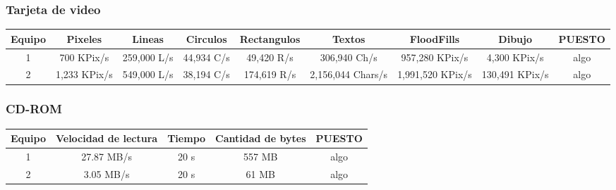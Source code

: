 \subsubsection{Tarjeta de video}
\begin{center}
\begin{tabular}{|ccccccccc|} \hline
\footnotesize\textbf{Equipo} & \footnotesize\textbf{Pixeles} & \footnotesize\textbf{Lineas} & \footnotesize\textbf{Circulos} & \footnotesize\textbf{Rectangulos} & \footnotesize\textbf{Textos} & \footnotesize\textbf{FloodFills} & \footnotesize\textbf{Dibujo} & \footnotesize\textbf{PUESTO} \\\hline
1 & 700 KPix/s & 259,000 L/s & 44,934 C/s & 49,420 R/s & 306,940 Ch/s & 957,280 KPix/s & 4,300 KPix/s & algo \\\hline
2 & 1,233 KPix/s & 549,000 L/s & 38,194 C/s & 174,619 R/s & 2,156,044 Chars/s & 1,991,520 KPix/s & 130,491 KPix/s & algo \\\hline
\end{tabular}
\end{center}

\subsubsection{CD-ROM}
\begin{center}
\begin{tabular}{|ccccc|} \hline
\footnotesize\textbf{Equipo} & \footnotesize\textbf{Velocidad de lectura} & \footnotesize\textbf{Tiempo} & \footnotesize\textbf{Cantidad de bytes} & \footnotesize\textbf{PUESTO} \\\hline
1 & 27.87 MB/s & 20 s & 557 MB & algo \\\hline
2 & 3.05 MB/s & 20 s & 61 MB & algo \\\hline
\end{tabular}
\end{center}

